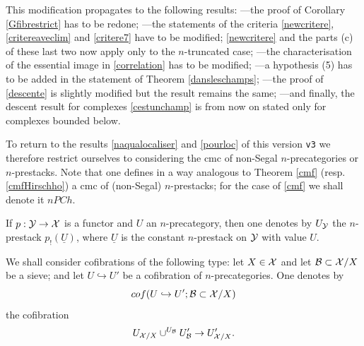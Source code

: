 This modification propagates to the following results:
\newline
---the proof of Corollary \ref{Gfibrestrict} has to be redone;
\newline
---the statements of the criteria \ref{newcritere}, \ref{critereaveclim}
and \ref{critere7} have to be modified;
\ref{newcritere} and the parts (c) of these last two now apply only to the
$n$-truncated case;
\newline
---the characterisation of the essential image in \ref{correlation} has to be
modified;
\newline
---a hypothesis (5) has to be added in the statement of Theorem
\ref{dansleschamps};
\newline
---the proof of \ref{descente} is slightly modified but the result remains the
same;
\newline
---and finally, the descent result for complexes \ref{cestunchamp} is from now
on stated only for complexes bounded below.

To return to the results \ref{naqualocaliser} and \ref{pourloc} of this version
{\tt v3} we therefore restrict ourselves to considering the cmc of non-Segal
$n$-precategories or $n$-prestacks. Note that one defines in a way analogous to
Theorem \ref{cmf} (resp. \ref{cmfHirschho}) a cmc of (non-Segal) $n$-prestacks;
for the case of \ref{cmf} we shall denote it $nPCh$.

If $p:{\cal Y} \rightarrow {\cal X}$ is a functor and $U$ an $n$-precategory, then one
denotes by $U_{{\cal Y}}$ the $n$-prestack $p_!(\underline{U})$, where
$\underline{U}$ is the constant $n$-prestack on ${\cal Y}$ with value $U$.

We shall consider cofibrations of the following type: let $X\in {\cal X}$ and let
${\cal B} \subset {\cal X} /X$ be a sieve; and let $U\hookrightarrow U'$ be a cofibration
of $n$-precategories. One denotes by
$$
cof(U\hookrightarrow U'; {\cal B} \subset
{\cal X} /X)
$$
the cofibration
$$
U_{{\cal X} /X} \cup ^{U_{{\cal B}}}U'_{{\cal B}} \rightarrow U'_{{\cal X} /X}.
$$


